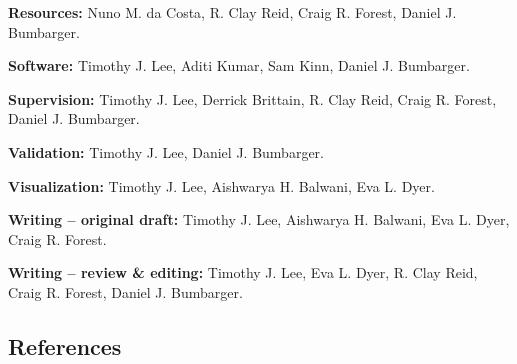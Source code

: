 \documentclass{article}
\begin{document}
\noindent\textbf{Resources:} Nuno M. da Costa, R. Clay Reid, Craig R. Forest, Daniel J. Bumbarger.

\noindent\textbf{Software:} Timothy J. Lee, Aditi Kumar, Sam Kinn, Daniel J. Bumbarger.

\noindent\textbf{Supervision:} Timothy J. Lee, Derrick Brittain, R. Clay Reid, Craig R. Forest, Daniel J. Bumbarger.

\noindent\textbf{Validation:} Timothy J. Lee, Daniel J. Bumbarger.

\noindent\textbf{Visualization:} Timothy J. Lee, Aishwarya H. Balwani, Eva L. Dyer.

\noindent\textbf{Writing – original draft:} Timothy J. Lee, Aishwarya H. Balwani, Eva L. Dyer, Craig R. Forest.

\noindent\textbf{Writing – review \& editing:} Timothy J. Lee, Eva L. Dyer, R. Clay Reid, Craig R. Forest, Daniel J. Bumbarger.

\subsection*{References}
\end{document}
